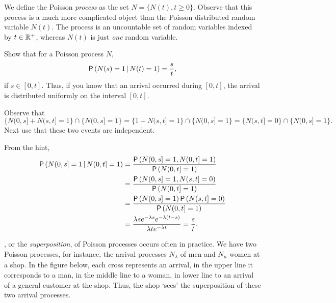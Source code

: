 We define the Poisson \emph{process} as the set $N=\{N(t), t\geq 0\}$. Observe that this process is a much more complicated object than the Poisson distributed random variable $N(t)$. The
process is an uncountable set of random variables indexed by  $t\in \mathbb{R}^+$, whereas $N(t)$ is just \emph{one} random variable.

\begin{exercise}
Show that  for a Poisson process $N$, 
\begin{equation*}
\P{N(s) =1\given N(t)=1} = \frac s t,
\end{equation*}
if $s\in[0,t]$. Thus, if you know that an arrival occurred during $[0,t]$, the arrival is distributed
uniformly on the interval $[0,t]$.
\begin{hint}
 Observe that 
  \begin{equation*}
\{N(0,s]+N(s,t]=1\}\cap\{N(0,s]=1\} = \{1+N(s,t]=1\}\cap\{N(0,s]=1\}=\{N(s,t]=0\}\cap\{N(0,s]=1\}.
  \end{equation*}
Next use that these two events are independent.
\end{hint}
\begin{solution}
From the hint,
\begin{align*}
  \P{N(0,s] =1\given N(0,t]=1} 
&= \frac{\P{N(0,s] =1, N(0,t]=1}}{\P{N(0,t]=1}} \\
&= \frac{\P{N(0,s] =1, N(s,t]=0}}{\P{N(0,t]=1}} \\
&= \frac{\P{N(0,s] =1}\P{N(s,t]=0}}{\P{N(0,t]=1}} \\
&= \frac{\lambda s e^{-\lambda s} e^{-\lambda (t-s)}}{\lambda t e^{-\lambda t}} = \frac s t.
\end{align*}
\end{solution}
\end{exercise}

 


, or the \emph{superposition}, of Poisson processes
occurs often in practice.  We have two Poisson processes, for
instance, the arrival processes $N_\lambda$ of men and $N_\mu$ women
at a shop. In the figure below, each cross represents an arrival, in
the upper line it corresponds to a man, in the middle line to a woman, in
lower line to an arrival of a general customer at the shop. Thus, the
shop `sees' the superposition of these two arrival
processes.




